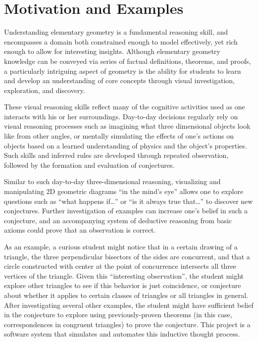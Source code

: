 \chapter{Motivation and Examples}
\label{chap:motivation}

Understanding elementary geometry is a fundamental reasoning skill,
and encompasses a domain both constrained enough to model effectively,
yet rich enough to allow for interesting insights.  Although
elementary geometry knowledge can be conveyed via series of factual
definitions, theorems, and proofs, a particularly intriguing aspect of
geometry is the ability for students to learn and develop an
understanding of core concepts through visual investigation,
exploration, and discovery.

These visual reasoning skills reflect many of the cognitive activities
used as one interacts with his or her surroundings.  Day-to-day
decisions regularly rely on visual reasoning processes such as
imagining what three dimensional objects look like from other angles,
or mentally simulating the effects of one's actions on objects based
on a learned understanding of physics and the object's properties.
Such skills and inferred rules are developed through repeated
observation, followed by the formation and evaluation of conjectures.

Similar to such day-to-day three-dimensional reasoning, visualizing
and manipulating 2D geometric diagrams ``in the mind's eye'' allows
one to explore questions such as ``what happens if\ldots''  or ``is it
always true that\ldots''  to discover new conjectures.  Further
investigation of examples can increase one's belief in such a
conjecture, and an accompanying system of deductive reasoning from
basic axioms could prove that an observation is correct.

As an example, a curious student might notice that in a certain
drawing of a triangle, the three perpendicular bisectors of the sides
are concurrent, and that a circle constructed with center at the point
of concurrence intersects all three vertices of the triangle.  Given
this ``interesting observation'', the student might explore other
triangles to see if this behavior is just coincidence, or conjecture
about whether it applies to certain classes of triangles or all
triangles in general.  After investigating several other examples, the
student might have sufficient belief in the conjecture to explore
using previously-proven theorems (in this case, correspondences in
congruent triangles) to prove the conjecture.  This project is a
software system that simulates and automates this inductive thought
process.

